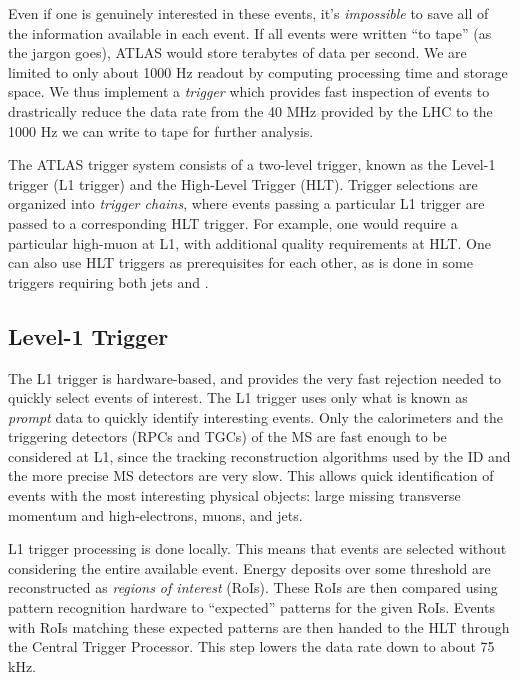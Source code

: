 Even if one is genuinely interested in these events, it's \textit{impossible} to save all of the information available in each event.
If all events were written ``to tape'' (as the jargon goes), ATLAS would store terabytes of data per second.
We are limited to only about 1000 Hz readout by computing processing time and storage space.
We thus implement a \textit{trigger} which provides fast inspection of events to drastrically reduce the data rate from the 40 MHz provided by the LHC to the 1000 Hz we can write to tape for further analysis.

The ATLAS trigger system consists of a two-level trigger, known as the Level-1 trigger (L1 trigger) and the High-Level Trigger (HLT)\footnotemark.
Trigger selections are organized into \textit{trigger chains}, where events passing a particular L1 trigger are passed to a corresponding HLT trigger.
For example, one would require a particular high-\pt muon at L1, with additional quality requirements at HLT.
One can also use HLT triggers as prerequisites for each other, as is done in some triggers requiring both jets and \met.

\subsection{Level-1 Trigger}

The L1 trigger is hardware-based, and provides the very fast rejection needed to quickly select events of interest.
The L1 trigger uses only what is known as \textit{prompt} data to quickly identify interesting events.
Only the calorimeters and the triggering detectors (RPCs and TGCs)  of the MS are fast enough to be considered at L1, since the tracking reconstruction algorithms used by the ID and the more precise MS detectors are very slow.
This allows quick identification of events with the most interesting physical objects: large missing transverse momentum and high-\pt electrons, muons, and jets.

L1 trigger processing is done locally.
This means that events are selected without considering the entire available event.
Energy deposits over some threshold are reconstructed as \textit{regions of interest} (RoIs).
These RoIs are then compared using pattern recognition hardware to ``expected'' patterns for the given RoIs.
Events with RoIs matching these expected patterns are then handed to the HLT through the Central Trigger Processor.
This step lowers the data rate down to about 75 kHz.

